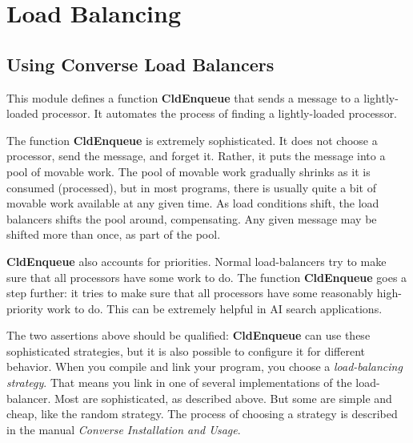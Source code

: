 \chapter{Load Balancing}

\section{Using Converse Load Balancers}

This module defines a function {\bf CldEnqueue} that sends a message
to a lightly-loaded processor.  It automates the process of finding a
lightly-loaded processor.  

The function {\bf CldEnqueue} is extremely sophisticated.  It does not
choose a processor, send the message, and forget it.  Rather, it puts
the message into a pool of movable work.  The pool of movable work
gradually shrinks as it is consumed (processed), but in most programs,
there is usually quite a bit of movable work available at any given
time.  As load conditions shift, the load balancers shifts the pool
around, compensating.  Any given message may be shifted more than
once, as part of the pool.

{\bf CldEnqueue} also accounts for priorities.  Normal load-balancers
try to make sure that all processors have some work to do.  The
function {\bf CldEnqueue} goes a step further: it tries to make sure
that all processors have some reasonably high-priority work to do.
This can be extremely helpful in AI search applications.

The two assertions above should be qualified: {\bf CldEnqueue} can use
these sophisticated strategies, but it is also possible to configure
it for different behavior.  When you compile and link your program, you
choose a {\sl load-balancing strategy}.  That means you link in one of
several implementations of the load-balancer.  Most are sophisticated,
as described above.  But some are simple and cheap, like the random
strategy.  The process of choosing a strategy is described in the
manual {\em Converse Installation and Usage}.



